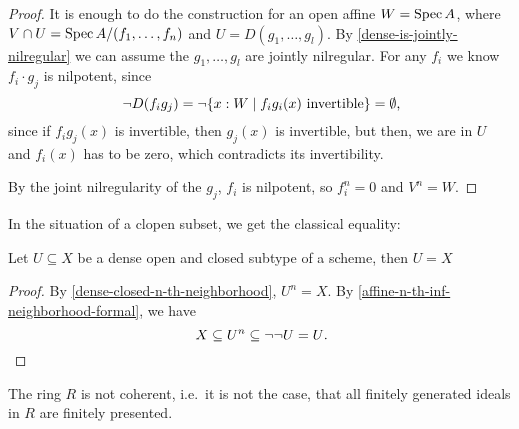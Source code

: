 \begin{proof}
  It is enough to do the construction for an open affine $W=\operatorname{Spec} A$,
  where $V\cap U=\operatorname{Spec} A/(f_1,\dots,f_n)$ and
  $U=D(g_1,\dots,g_l)$.
  By \cref{dense-is-jointly-nilregular} we can assume the $g_1,\dots,g_l$
  are jointly nilregular.
  For any $f_i$ we know $f_i\cdot g_j$ is nilpotent, since
  \[ \neg D(f_ig_j)=\neg\{x:W\mid f_ig_i(x)\text{ invertible}\} =\emptyset\rlap{,}\]
  since if $f_ig_j(x)$ is invertible, then $g_j(x)$ is invertible, but then, we are in
  $U$ and $f_i(x)$ has to be zero, which contradicts its invertibility.

  By the joint nilregularity of the $g_j$, $f_i$ is nilpotent,
  so $f_i^n=0$ and $V^n=W$.
\end{proof}

In the situation of a clopen subset, we get the classical equality:

\begin{lemma}%
  \label{clopen-dense-is-all}
  Let $U\subseteq X$ be a dense open and closed subtype of a scheme,
  then $U=X$
\end{lemma}

\begin{proof}
  By \cref{dense-closed-n-th-neighborhood},
  $U^n=X$.
  By \cref{affine-n-th-inf-neighborhood-formal}, we have
  \[
    X\subseteq U^n\subseteq \neg\neg U = U\rlap{.}
  \]
\end{proof}

\begin{theorem}%
  The ring $R$ is not coherent, i.e.\ it is not the case,
  that all finitely generated ideals in $R$ are finitely presented.
\end{theorem}

